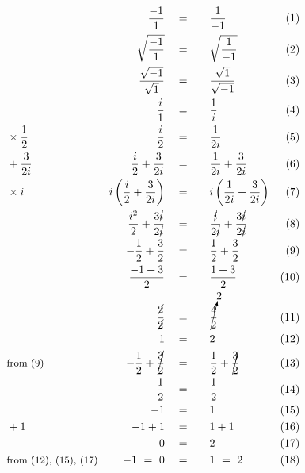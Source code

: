 \begin{alignat*}{5}
&\,&\frac{-1}{1}\quad&=\quad&&\frac{1}{-1}\quad&(1)\\
&\,&\sqrt{\frac{-1}{1}}\quad&=&&\sqrt{\frac{1}{-1}}&(2)\\
&\,&\frac{\sqrt{-1}}{\sqrt{1}}\quad&=&&\frac{\sqrt{1}}{\sqrt{-1}}&(3)\\
&\,&\frac{i}{1}\quad&=&&\frac{1}{i}&(4)\\
&\small\times\frac{1}{2}&\frac{i}{2}\quad&=&&\frac{1}{2i}&(5)\\
&\small+\frac{3}{2i}&\frac{i}{2}+\frac{3}{2i}\quad&=&&\frac{1}{2i}+\frac{3}{2i}&(6)\\
&\times i&i\left(\frac{i}{2}+\frac{3}{2i}\right)\quad&=&&i\left(\frac{1}{2i}+\frac{3}{2i}\right)&(7)\\
&\,&\frac{i^2}{2}+\frac{3\cancel{i}}{2\cancel{i}}\quad&=&&\frac{\cancel{i}}{2\cancel{i}}+\frac{3\cancel{i}}{2\cancel{i}}&(8)\\
&\,&-\frac{1}{2}+\frac{3}{2}\quad&=&&\frac{1}{2}+\frac{3}{2}&(9)\\
&\,&\frac{-1+3}{2}\quad&=&&\frac{1+3}{2}&(10)\\
&\,&\frac{\cancel{2}}{\cancel{2}}\quad&=&&\cancelto{2}{\frac{4}{2}}&(11)\\
&\,&1\quad&=&&2&(12)\\
&\small\text{from (9)}&-\frac{1}{2}+\cancel{\frac{3}{2}}\quad&=&&\frac{1}{2}+\cancel{\frac{3}{2}}&(13)\\
&\,&-\frac{1}{2}\quad&=&&\frac{1}{2}&(14)\\
&\,&-1\quad&=&&1&(15)\\
&+1&-1+1\quad&=&&1+1&(16)\\
&\,&0\quad&=&&2&(17)\\
&\small\text{from (12), (15), (17)}&-1~=~0\quad&=&&1~=~2&(18)
\end{alignat*}
